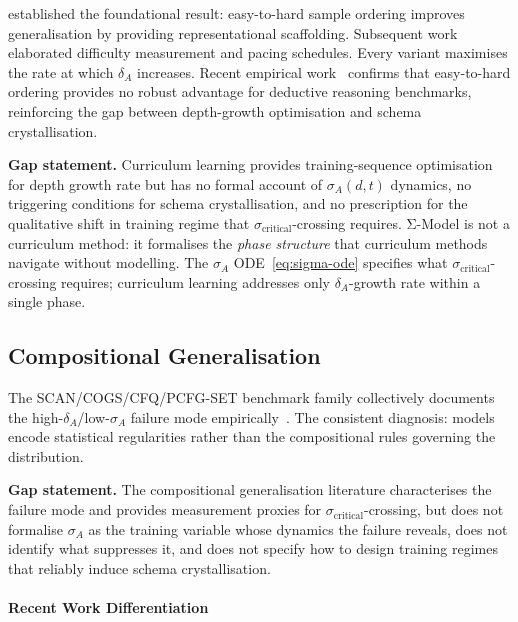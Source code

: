 \cite{bengio2009curriculumlearning} established the foundational result:
easy-to-hard sample ordering improves generalisation by providing
representational scaffolding. Subsequent work elaborated difficulty
measurement \citep{kumar2010selfpacedlearning,portelas2020automaticcurriculumlearningdeep,
narvekar2020curriculumlearningreinforcementlearning} and pacing schedules.
Every variant maximises the rate at which $\delta_A$ increases.
Recent empirical work~\cite{mordig2026rethinkingeasytohard} confirms
that easy-to-hard ordering provides no robust advantage for
deductive reasoning benchmarks, reinforcing the gap between
depth-growth optimisation and schema crystallisation.

\textbf{Gap statement.} Curriculum learning provides training-sequence
optimisation for depth growth rate but has no formal account of
$\sigma_A(d,t)$ dynamics, no triggering conditions for schema
crystallisation, and no prescription for the qualitative shift in
training regime that $\sigma_{\text{critical}}$-crossing requires. Σ-Model
is not a curriculum method: it formalises the \emph{phase structure} that
curriculum methods navigate without modelling. The
$\sigma_A$ ODE~\eqref{eq:sigma-ode} specifies what
$\sigma_{\text{critical}}$-crossing requires; curriculum learning
addresses only $\delta_A$-growth rate within a single phase.

\subsection{Compositional Generalisation}\label{sec:compositional-generalisation}

The SCAN/COGS/CFQ/PCFG-SET benchmark family collectively documents the
high-$\delta_A$/low-$\sigma_A$ failure mode empirically~\citep{mondorf2026compositionalarc}.
The consistent diagnosis: models encode statistical regularities rather than the
compositional rules governing the distribution.

\textbf{Gap statement.} The compositional generalisation literature
characterises the failure mode and provides measurement proxies for
$\sigma_{\text{critical}}$-crossing, but does not formalise $\sigma_A$
as the training variable whose dynamics the failure reveals, does not
identify what suppresses it, and does not specify how to design training
regimes that reliably induce schema crystallisation.

\paragraph{Recent Work Differentiation}

